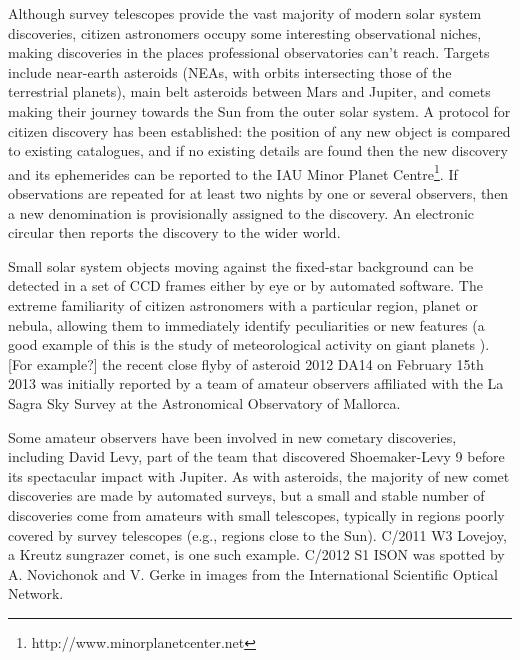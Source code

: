 \documentclass{ar2e}
\begin{document}
% 


Although survey telescopes provide the vast majority of modern solar system
discoveries, citizen astronomers occupy some interesting observational niches,
making discoveries in the places professional observatories can't reach. Targets
include near-earth asteroids (NEAs, with orbits intersecting those of the
terrestrial planets), main belt asteroids between Mars and Jupiter, and comets
making their journey towards the Sun from the outer solar system. A protocol for
citizen discovery has been established: the position of any new object is
compared to existing catalogues, and if no existing details are found then the
new discovery and its ephemerides can be reported to the IAU Minor Planet
Centre\footnote{http://www.minorplanetcenter.net}.   If observations are
repeated for at least two nights by one or several observers, then a new
denomination is provisionally assigned to the discovery.   An electronic
circular then reports the discovery to the wider world.

Small solar system objects moving against the fixed-star background can be
detected in a set of CCD frames either by eye or by automated software. The
extreme familiarity of citizen astronomers with a particular region, planet or
nebula, allowing them to immediately identify peculiarities or new features (a
good example of this is the study of meteorological activity on giant planets
\citep{95rogers}).   [For example?] the recent close flyby of asteroid 2012 DA14
on February 15th 2013 was initially reported by a team of amateur observers
affiliated with the La Sagra Sky Survey at the Astronomical Observatory of
Mallorca.  

Some amateur observers have been involved in new cometary discoveries, including
David Levy, part of the team that discovered Shoemaker-Levy 9 before its
spectacular impact with Jupiter.   As with asteroids, the majority of new comet discoveries are
made by automated surveys, but a small and stable number of discoveries come
from amateurs with small telescopes, typically in regions poorly covered by
survey telescopes (e.g., regions close to the Sun).   C/2011 W3 Lovejoy, a
Kreutz sungrazer comet, is one such example.  C/2012 S1 ISON was spotted by A.
Novichonok and V. Gerke in images from the International Scientific Optical
Network.  
\end{document}
